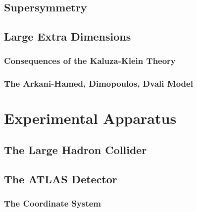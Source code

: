 \documentclass[10pt,twoside,cucitura,classica,english,openany]{toptesi}
\begin{document}


\section{Supersymmetry}
\label{sec:supersymmetry}



\section{Large Extra Dimensions}
\label{sec:large-extra-dimens}



\subsection{Consequences of the Kaluza-Klein Theory}
\label{sec:cons-kaluza-klein}



\subsection{The Arkani-Hamed, Dimopoulos, Dvali Model}
\label{sec:arkani-hamed-dimop}



\chapter{Experimental Apparatus}
\label{cha:exper-appar}

\section{The Large Hadron Collider}
\label{sec:large-hadr-coll}



\section{The ATLAS Detector}
\label{sec:atlas-detector}



\subsection{The Coordinate System}
\label{sec:coordinate-system}


\end{document}
